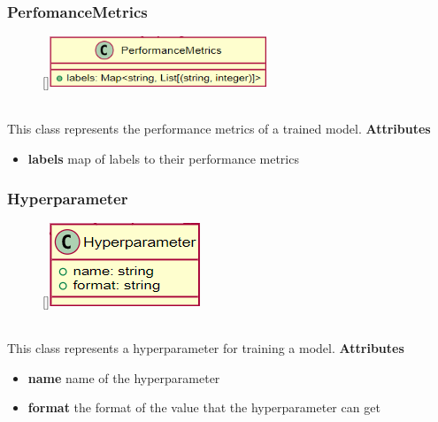 \subsubsection{PerfomanceMetrics}
\label{PerformanceMetrics}
\begin{figure}
    \raisebox{0pt}[\dimexpr{}\baselineskip\relax]{\includegraphics[width=6.5cm]{classes/model-management/12.png}}
\end{figure} 
~\\
This class represents the performance metrics of a trained model.
\newline
\newline
\newline
\textbf{Attributes}
\begin{itemize}
    \item \textbf{labels} map of labels to their performance metrics
\end{itemize}

\subsubsection{Hyperparameter}
\label{Hyperparameter}
\begin{figure}
    \raisebox{0pt}[\dimexpr{}\baselineskip\relax]{\includegraphics[width=4.5cm]{classes/model-management/13.png}}
\end{figure} 
~\\
This class represents a hyperparameter for training a model.
\newline
\newline
\newline
\newline
\newline
\textbf{Attributes}
\begin{itemize}
    \item \textbf{name} name of the hyperparameter
    \item \textbf{format} the format of the value that the hyperparameter can get
\end{itemize}

